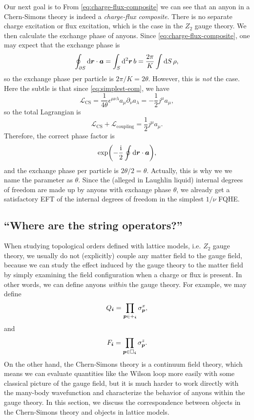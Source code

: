 \documentclass[hyperref, a4paper]{article}
\newcommand*{\ii}{\mathrm{i}}
\def\mathbb#1{#1}%
\begin{document}
Our next goal is to 
From \eqref{eq:charge-flux-composite} we can see that an anyon in a Chern-Simons theory is indeed a
\emph{charge-flux composite}. There is no separate charge excitation or flux excitation, 
which is the case in the $\mathbb{Z}_2$ gauge theory. We then calculate the exchange phase of anyons.
Since \eqref{eq:charge-flux-composite}, one may expect that the exchange phase is 
\[
    \oint_{\partial S} \dd{\vb*{r}} \cdot \vb*{a} = \int_S \dd[2]{\vb*{r}} b = \frac{2\pi}{K} \int \dd{S} \rho,
\] 
so the exchange phase per particle is $2\pi / K = 2 \theta$. However, this is \emph{not} the case.
Here the subtle is that since \eqref{eq:simplest-eom}, we have 
\[
    \mathcal{L}_\text{CS} = \frac{1}{4 \theta} \epsilon^{\mu \nu \lambda} a_\mu \partial_\nu a_\lambda = - \frac{1}{2} j^\mu a_\mu,
\]
so the total Lagrangian is 
\[
    \mathcal{L}_\text{CS} + \mathcal{L}_\text{coupling} = \frac{1}{2} j^\mu a_\mu.
\]
Therefore, the correct phase factor is 
\[
    \exp(- \frac{\ii}{2} \oint \dd{\vb*{r}} \cdot \vb*{a}),
\]
and the exchange phase per particle is $2 \theta / 2 = \theta$. Actually, this is why we we name the parameter as $\theta$. 
Since the (alleged in Laughlin liquid) internal degrees of freedom are made up by anyons with exchange phase $\theta$,
we already get a satisfactory EFT of the internal degrees of freedom in the simplest $1/ \nu$ FQHE.

\subsection{``Where are the string operators?''}

When studying topological orders defined with lattice models, i.e. $\mathbb{Z}_2$ gauge theory, we usually 
do not (explicitly) couple any matter field to the gauge field, because we can study the effect induced by 
the gauge theory to the matter field by simply examining the field configuration when a charge or flux is 
present. In other words, we can define anyons \emph{within} the gauge theory. For example, we may define 
\begin{equation}
    Q_{\vb*{i}} = \prod_{\vb*{p} \in +_{\vb*{i}}} \sigma^x_{\vb*{p}},
\end{equation}
and 
\begin{equation}
    F_{\vb*{i}} = \prod_{\vb*{p} \in \Box_{\vb*{i}}} \sigma^z_{\vb*{p}}.
\end{equation}
On the other hand, the Chern-Simons theory is a continuum field theory, which means we can evaluate quantities like the 
Wilson loop more easily with some classical picture of the gauge field, but it is much harder to 
work directly with the many-body wavefunction and characterize the behavior of anyons within the 
gauge theory. In this section, we discuss the correspondence between objects in the Chern-Simons theory 
and objects in lattice models.
\end{document}
